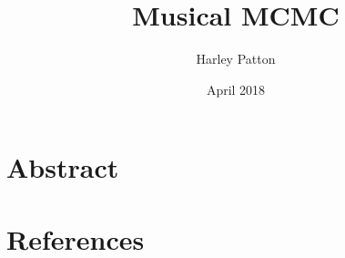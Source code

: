 \documentclass[12pt]{article}
\title{Musical MCMC}
\author{Harley Patton} %
\date{April 2018}
\begin{document}
\maketitle

\section{Abstract}

\section{References}
\end{document}
